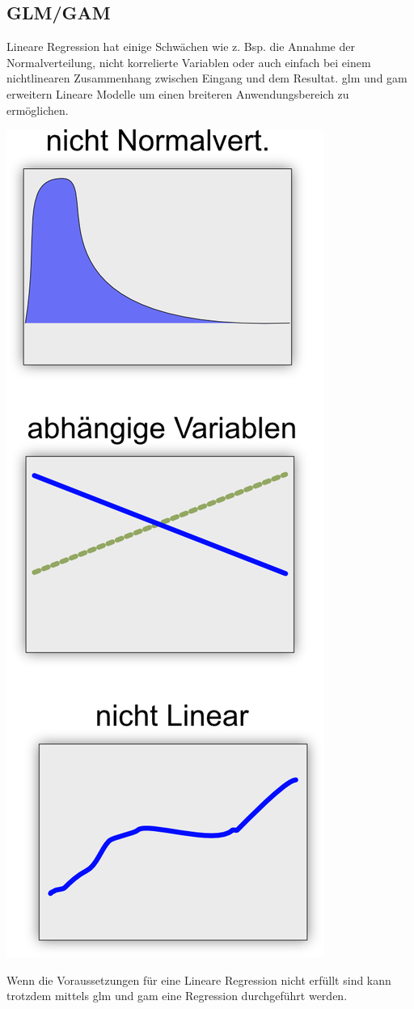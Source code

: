 \documentclass[
  12pt, %
  a4paper, %
  oneside, %
  openany, 
  numbers=noenddot, %
  BCOR=5mm, %
  parskip=half*, %
  thesis, %
]{bfhbook}
\begin{document}
\subsection{GLM/GAM}
Lineare Regression hat einige Schwächen wie z. Bsp. die Annahme der Normalverteilung, nicht korrelierte Variablen oder auch einfach bei einem nichtlinearen Zusammenhang zwischen Eingang und dem Resultat. \acrfull{glm} und \acrfull{gam} erweitern Lineare Modelle um einen breiteren Anwendungsbereich zu ermöglichen.
\begin{center}
\begin{minipage}[t]{0.45\linewidth}
\vspace{0pt}
\includegraphics[width=0.6\linewidth]{Bilder/Regressions-Auschluss-Bedingungen.png}
\end{minipage}\hfill
\begin{minipage}[t]{0.45\linewidth}
\vspace{0pt}
Wenn die Voraussetzungen für eine Lineare Regression nicht erfüllt sind kann trotzdem mittels \Gls{glm} und \Gls{gam} eine Regression durchgeführt werden.
\end{minipage}
\end{center}
\end{document}
